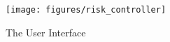 \begin{comment}
Third, individual hypothesis descriptions should be augmented with information about how much data $n^{H1}$ the user has to add, under the assumption that the new data will follow the current observed distribution of the data, to make an hypothesis significant. 
While sounding counter-intuitive, as one might (wrongly) imply, it is possible to make any hypothesis true by adding more data, calculating this value is in some fields already common practice. 
For example, in genetics scientist often search (automatically) for correlations between genes and high-level effects (like cancer). 
If such a correlation is found, often because of the multiple hypothesis error the chance of a true discovery is tiny (i.e., the \pval is too high). 
In that case the scientist works backwards and estimates how much more genes she has to to sequence in order to make the hypothesis relevant, expecting that the new data (e.g., gene sequences) follow the same distribution of the data the scientist already has.
However, if the effect was just produced by chance, the new data will be more similar to the distribution of the null-hypothesis and the null will not be rejected.  
The required value is generally easy to calculate or approximate,  and are highly valuable for the end-user. 
A small value for $n^{H1}$ in relation to the number of totally tested hypotheses might be an indication that the power (i.e., the chance to accept a true alternative hypothesis) of the test was not sufficiently large. 

And finally, users should be able to bookmark important hypotheses. 
Our system uses default hypothesis throughout the exploration and the user might find it too cumbersome to correct everyone for his real intentions, there might be more hypotheses generated than the user intended to test. 
Even if all hypotheses are what the user was considering, some of them might be more important to her than others; the hypotheses the user would like to include in a presentation or show to her boss. 
A key key question becomes, what is the expected number of false discoveries among those important discoveries?
\end{comment}

\begin{figure}
\centering
\texttt{[image: figures/risk\_controller]}
\caption{The \system{} User Interface}
\label{fig:ui}	
\end{figure}

